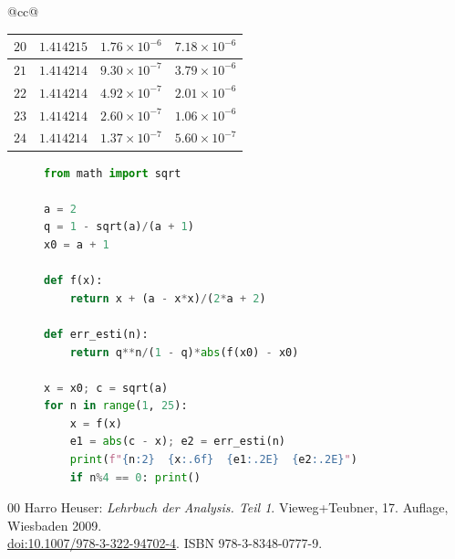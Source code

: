 \documentclass[
  a4paper, 11pt, fleqn, twoside,
  abstract=true
]{scrartcl}
\theoremstyle{plain}
\theoremstyle{definition}
\begin{document}
\begin{table}
\begin{center}
\begin{tabular}{@{}cc@{}}
\begin{tabular}{rccc}
$20$ & $1.414215$ & $1.76\times 10^{-6}$ & $7.18\times 10^{-6}$\\
\midrule
$21$ & $1.414214$ & $9.30\times 10^{-7}$ & $3.79\times 10^{-6}$\\
$22$ & $1.414214$ & $4.92\times 10^{-7}$ & $2.01\times 10^{-6}$\\
$23$ & $1.414214$ & $2.60\times 10^{-7}$ & $1.06\times 10^{-6}$\\
$24$ & $1.414214$ & $1.37\times 10^{-7}$ & $5.60\times 10^{-7}$\\
\bottomrule
\end{tabular}
\end{tabular}
\end{center}
\end{table}

\begin{figure}
\begin{lstlisting}[language=Python,
caption={Berechnungsverfahren}, label={lst:Berechnung}]
from math import sqrt

a = 2
q = 1 - sqrt(a)/(a + 1)
x0 = a + 1

def f(x):
    return x + (a - x*x)/(2*a + 2)

def err_esti(n):
    return q**n/(1 - q)*abs(f(x0) - x0)

x = x0; c = sqrt(a)
for n in range(1, 25):
    x = f(x)
    e1 = abs(c - x); e2 = err_esti(n)
    print(f"{n:2}  {x:.6f}  {e1:.2E}  {e2:.2E}")
    if n%4 == 0: print()
\end{lstlisting}
\end{figure}


\begin{thebibliography}{00}
 Harro Heuser: \emph{Lehrbuch der Analysis. Teil 1}.
  Vieweg+Teubner, 17. Auflage, Wiesbaden 2009.\\
  \href{https://doi.org/10.1007/978-3-322-94702-4}{doi:10.1007/978-3-322-94702-4}.
  ISBN 978-3-8348-0777-9.
\end{thebibliography}
\end{document}
